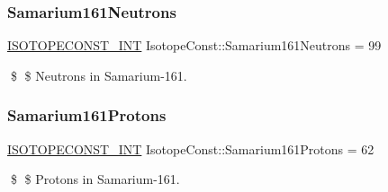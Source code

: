 \subsubsection{\texorpdfstring{Samarium161\+Neutrons}{Samarium161Neutrons}}
{\footnotesize\ttfamily \mbox{\hyperlink{group___isotope_const-_macros_ga5f18360b3e99483a35c32d789e62621c}{I\+S\+O\+T\+O\+P\+E\+C\+O\+N\+S\+T\+\_\+\+I\+NT}} Isotope\+Const\+::\+Samarium161\+Neutrons = 99}

\$ \$ Neutrons in Samarium-\/161. \mbox{\label{group___isotope_const-_samarium-_sm161_gad08882b0957d424d8e2262c8c03c4dd8}} 
\subsubsection{\texorpdfstring{Samarium161\+Protons}{Samarium161Protons}}
{\footnotesize\ttfamily \mbox{\hyperlink{group___isotope_const-_macros_ga5f18360b3e99483a35c32d789e62621c}{I\+S\+O\+T\+O\+P\+E\+C\+O\+N\+S\+T\+\_\+\+I\+NT}} Isotope\+Const\+::\+Samarium161\+Protons = 62}

\$ \$ Protons in Samarium-\/161. 